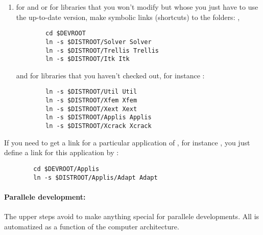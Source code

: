 \begin{enumerate}
\begin{itemize}
\begin{verbatim}
        \end{verbatim} 
    \end{itemize}
 
  
    
\item for  and  or for libraries that you won't modify but whose you just have to use the up-to-date version, make symbolic links (shortcuts) to
the    folders:  ,
        \begin{verbatim}
        cd $DEVROOT
        ln -s $DISTROOT/Solver Solver
        ln -s $DISTROOT/Trellis Trellis
        ln -s $DISTROOT/Itk Itk
        \end{verbatim}
        and for libraries that you haven't checked out, for instance :
        \begin{verbatim}
        ln -s $DISTROOT/Util Util
        ln -s $DISTROOT/Xfem Xfem
        ln -s $DISTROOT/Xext Xext
        ln -s $DISTROOT/Applis Applis
        ln -s $DISTROOT/Xcrack Xcrack
        \end{verbatim}
\end{enumerate}

If you need to get a link for a particular application of , for instance , you just define a link for this application by :
        \begin{verbatim}
        cd $DEVROOT/Applis
        ln -s $DISTROOT/Applis/Adapt Adapt
        \end{verbatim}




\paragraph*{Parallele development:}

The upper steps avoid to make anything special for parallele
developments. All is automatized as a function of the computer
architecture.
